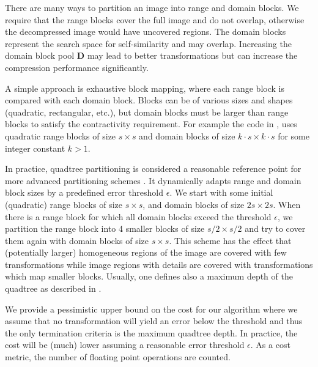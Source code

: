 There are many ways to partition an image into range and domain blocks. We require that the range blocks cover the full image and do not overlap, otherwise the
decompressed image would have uncovered regions. The domain blocks represent the search space for self-similarity and may overlap.
Increasing the domain block pool $\boldsymbol{D}$ may lead to better transformations but can increase the compression performance significantly.

A simple approach is exhaustive block mapping, where each range block is compared with each domain block. Blocks can be of various sizes and shapes 
(quadratic, rectangular, etc.), but domain blocks must be larger than range blocks to satisfy the contractivity requirement. For example the code in \cite{github-python}, 
uses quadratic range blocks of size $s \times s$ and domain blocks of size $k\cdot s \times k \cdot s$ for some integer constant $k > 1$.

In practice, quadtree partitioning is considered a reasonable reference point for more advanced partitioning schemes \cite{fisher2012}.
It dynamically adapts range and domain block sizes by a predefined error threshold $\epsilon$.
We start with some initial (quadratic) range blocks of size $s \times s$, and domain blocks of size $2s \times 2s$.
When there is a range block for which all domain blocks exceed the threshold $\epsilon$, we partition
the range block into 4 smaller blocks of size $s/2 \times s/2$ and try to cover them again with domain blocks of size $s \times s$.
This scheme has the effect that (potentially larger) homogeneous regions of the image are covered with few transformations while image
regions with details are covered with transformations which map smaller blocks.
Usually, one defines also a maximum depth of the quadtree as described in \cite{fisher2012}.


We provide a pessimistic upper bound on the cost for our
algorithm where we assume that no transformation will yield an error below
the threshold and thus the only termination criteria is the maximum quadtree
depth. In practice, the cost will be (much) lower assuming a reasonable error
threshold $\epsilon$. As a cost metric, the number of floating point operations
are counted.


